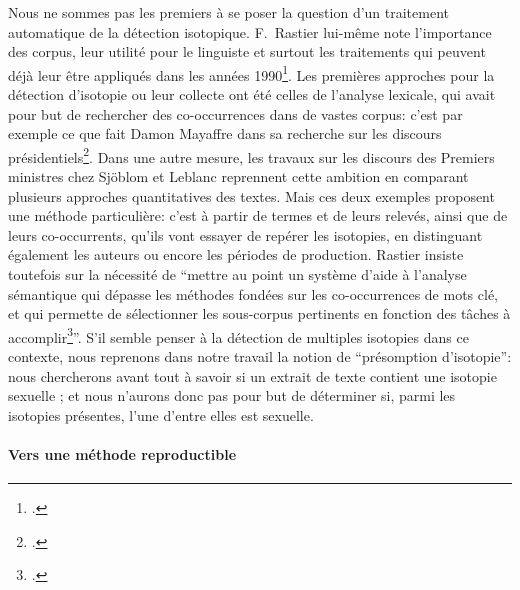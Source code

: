 Nous ne sommes pas les premiers à se poser la question d'un traitement automatique de la détection isotopique. F.~Rastier lui-même note l'importance des corpus, leur utilité pour le linguiste et surtout les traitements qui peuvent déjà leur être appliqués dans les années 1990\footcite{rastier_semantique_1996}. Les premières approches pour la détection d'isotopie ou leur collecte ont été celles de l'analyse lexicale, qui avait pour but de rechercher des co-occurrences dans de vastes corpus: c'est par exemple ce que fait Damon Mayaffre dans sa recherche sur les discours présidentiels\footcite{mayaffre2008occurrence}. Dans une autre mesure, les travaux sur les discours des Premiers ministres chez Sjöblom et Leblanc reprennent cette ambition en comparant plusieurs approches quantitatives des textes. Mais ces deux exemples proposent une méthode particulière: c'est à partir de termes et de leurs relevés, ainsi que de leurs co-occurrents, qu'ils vont essayer de repérer les isotopies, en distinguant également les auteurs ou encore les périodes de production. Rastier insiste toutefois sur la nécessité de \enquote{mettre  au  point  un  système  d’aide à l’analyse  sémantique  qui dépasse les méthodes fondées sur les co-occurrences de mots clé, et qui permette de sélectionner les sous-corpus pertinents en fonction des tâches à accomplir\footcite[p.~31]{rastier_semantique_1996}}. S'il semble penser à la détection de multiples isotopies dans ce contexte, nous reprenons dans notre travail la notion de \enquote{présomption d'isotopie}: nous chercherons avant tout à savoir si un extrait de texte contient une isotopie sexuelle ; et nous n'aurons donc pas pour but de déterminer si, parmi les isotopies présentes, l'une d'entre elles est sexuelle.

\paragraph{Vers une méthode reproductible}



